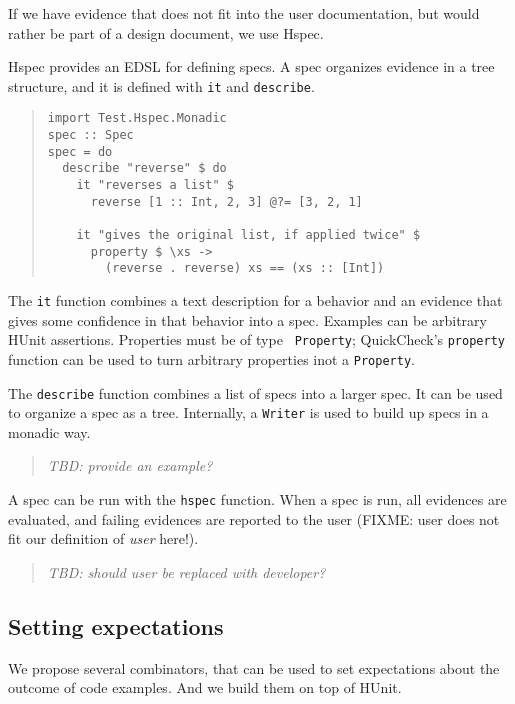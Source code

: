 \documentclass[preprint]{sigplanconf}
\begin{document}
If we have evidence that does not fit into the user documentation, but would
rather be part of a design document, we use Hspec.

Hspec provides an EDSL for defining specs.  A spec organizes evidence in a
tree structure, and it is defined with \texttt{it} and \texttt{describe}.

\begin{quote}
\small
\begin{verbatim}
import Test.Hspec.Monadic
spec :: Spec
spec = do
  describe "reverse" $ do
    it "reverses a list" $
      reverse [1 :: Int, 2, 3] @?= [3, 2, 1]

    it "gives the original list, if applied twice" $
      property $ \xs ->
        (reverse . reverse) xs == (xs :: [Int])
\end{verbatim}
\end{quote}

\noindent The {\tt it} function combines a text description for a behavior and
an evidence that gives some confidence in that behavior into a
spec.
Examples can be arbitrary HUnit assertions.  Properties must be of type {\tt
Property}; QuickCheck's \texttt{property} function can be used to turn
arbitrary properties inot a \texttt{Property}.

The \texttt{describe} function combines a list of specs into a larger spec.  It
can be used to organize a spec as a tree.
Internally, a \texttt{Writer} is used to build up specs in a monadic way.

\begin{quote}
    \emph{TBD: provide an example?}
\end{quote}

A spec can be run with the \texttt{hspec} function.  When a spec is run, all
evidences are evaluated, and failing evidences are
reported to the user (FIXME: user does not fit our definition of \emph{user}
here!).

\begin{quote}
    \emph{TBD: should user be replaced with developer?}
\end{quote}

\subsection{Setting expectations}

We propose several combinators, that can be used to set expectations
about the outcome of code examples.  And we build them on top of
HUnit.
\end{document}

